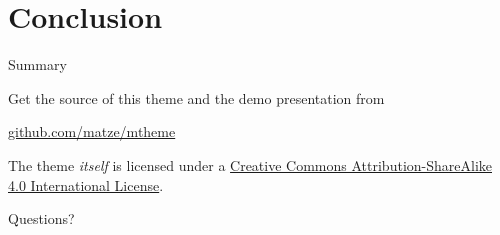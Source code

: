 \section{Conclusion}

\begin{frame}{Summary}

  Get the source of this theme and the demo presentation from

  \begin{center}\url{github.com/matze/mtheme}\end{center}

  The theme \emph{itself} is licensed under a
  \href{http://creativecommons.org/licenses/by-sa/4.0/}{Creative Commons
  Attribution-ShareAlike 4.0 International License}.\cite{DowningIntelligenceSystems}

  \begin{center}\ccbysa\end{center}

\end{frame}

\begin{frame}[standout]
  Questions?
\end{frame}